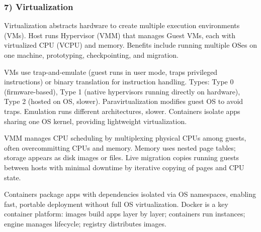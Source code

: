 \subsubsection*{7) Virtualization}
Virtualization abstracts hardware to create multiple execution environments (VMs). Host runs Hypervisor (VMM) that manages Guest VMs, each with virtualized CPU (VCPU) and memory. Benefits include running multiple OSes on one machine, prototyping, checkpointing, and migration.

VMs use trap-and-emulate (guest runs in user mode, traps privileged instructions) or binary translation for instruction handling. Types: Type 0 (firmware-based), Type 1 (native hypervisors running directly on hardware), Type 2 (hosted on OS, slower). Paravirtualization modifies guest OS to avoid traps. Emulation runs different architectures, slower. Containers isolate apps sharing one OS kernel, providing lightweight virtualization.

VMM manages CPU scheduling by multiplexing physical CPUs among guests, often overcommitting CPUs and memory. Memory uses nested page tables; storage appears as disk images or files. Live migration copies running guests between hosts with minimal downtime by iterative copying of pages and CPU state.

Containers package apps with dependencies isolated via OS namespaces, enabling fast, portable deployment without full OS virtualization. Docker is a key container platform: images build apps layer by layer; containers run instances; engine manages lifecycle; registry distributes images.

